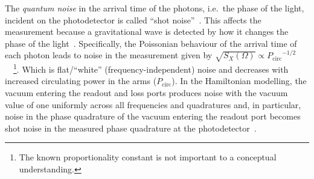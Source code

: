 
The \emph{quantum noise} in the arrival time of the photons, i.e.\ the phase of the light, incident on the photodetector is called ``shot noise''~\cite{}. This affects the measurement because a gravitational wave is detected by how it changes the phase of the light~\cite{}. %
Specifically, the Poissonian behaviour of the arrival time of each photon leads to noise in the measurement given by 
$\sqrt{S_X(\Omega)}\propto{P_\text{circ}}^{-1/2}$~\cite{}~\footnote{The known proportionality constant is not important to a conceptual understanding.}. %
Which is flat/``white'' (frequency-independent) noise and decreases with increased circulating power in the arms ($P_\text{circ}$).
In the Hamiltonian modelling, the vacuum entering the readout and loss ports produces noise with the vacuum value of one uniformly across all frequencies and quadratures and, in particular, noise in the phase quadrature of the vacuum entering the readout port becomes shot noise in the measured phase quadrature at the photodetector~\cite{}. 


